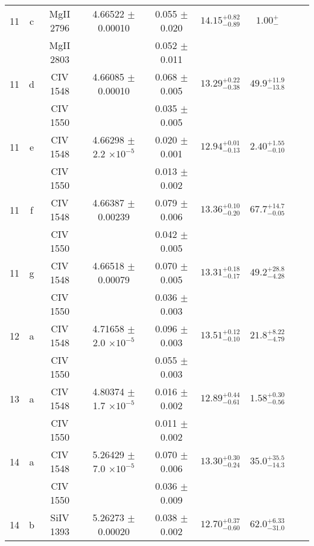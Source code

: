 \documentclass[12pt]{article}
\begin{document}
\begin{footnotesize}
\begin{longtable}{ c c c c c c c c c}
      11  & c  & MgII     2796  &  4.66522 $\pm$ 0.00010  &  0.055 $\pm$ 0.020   & $14.15_{ - 0.89}^{ + 0.82}$  & $1.00_{ -  }^{ +  }$    & 	 & \\ 
  &   & MgII     2803  &  &  0.052 $\pm$ 0.011   &   &     & 	 & \\ 
      11  & d  & CIV     1548  &  4.66085 $\pm$ 0.00010  &  0.068 $\pm$ 0.005   & $13.29_{ - 0.38}^{ + 0.22}$  & $49.9_{ - 13.8}^{ + 11.9}$    & 	 & \\ 
  &   & CIV     1550  &  &  0.035 $\pm$ 0.005   &   &     & 	 & \\ 
      11  & e  & CIV     1548  &  4.66298 $\pm$ 2.2 $\times 10^{-5}$   &  0.020 $\pm$ 0.001   & $12.94_{ - 0.13}^{ + 0.01}$  & $2.40_{ - 0.10}^{ + 1.55}$    & 	 & \\ 
  &   & CIV     1550  &  &  0.013 $\pm$ 0.002   &   &     & 	 & \\ 
      11  & f  & CIV     1548  &  4.66387 $\pm$ 0.00239  &  0.079 $\pm$ 0.006   & $13.36_{ - 0.20}^{ + 0.10}$  & $67.7_{ - 0.05}^{ + 14.7}$    & 	 & \\ 
  &   & CIV     1550  &  &  0.042 $\pm$ 0.005   &   &     & 	 & \\ 
      11  & g  & CIV     1548  &  4.66518 $\pm$ 0.00079  &  0.070 $\pm$ 0.005   & $13.31_{ - 0.17}^{ + 0.18}$  & $49.2_{ - 4.28}^{ + 28.8}$    & 	 & \\ 
  &   & CIV     1550  &  &  0.036 $\pm$ 0.003   &   &     & 	 & \\ 
      12  & a  & CIV     1548  &  4.71658 $\pm$ 2.0 $\times 10^{-5}$   &  0.096 $\pm$ 0.003   & $13.51_{ - 0.10}^{ + 0.12}$  & $21.8_{ - 4.79}^{ + 8.22}$    & 	 & \\ 
  &   & CIV     1550  &  &  0.055 $\pm$ 0.003   &   &     & 	 & \\ 
      13  & a  & CIV     1548  &  4.80374 $\pm$ 1.7 $\times 10^{-5}$   &  0.016 $\pm$ 0.002   & $12.89_{ - 0.61}^{ + 0.44}$  & $1.58_{ - 0.56}^{ + 0.30}$    & 	 & \\ 
  &   & CIV     1550  &  &  0.011 $\pm$ 0.002   &   &     & 	 & \\ 
      14  & a  & CIV     1548  &  5.26429 $\pm$ 7.0 $\times 10^{-5}$   &  0.070 $\pm$ 0.006   & $13.30_{ - 0.24}^{ + 0.30}$  & $35.0_{ - 14.3}^{ + 35.5}$    & 	 & \\ 
  &   & CIV     1550  &  &  0.036 $\pm$ 0.009   &   &     & 	 & \\ 
      14  & b  & SiIV     1393  &  5.26273 $\pm$ 0.00020  &  0.038 $\pm$ 0.002   & $12.70_{ - 0.60}^{ + 0.37}$  & $62.0_{ - 31.0}^{ + 6.33}$    & 	 & \\ 

\end{longtable}
\end{footnotesize}
\end{document}

